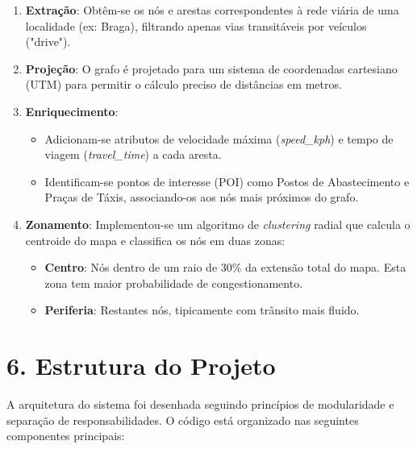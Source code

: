 \documentclass[a4paper]{article}
\begin{document}
\begin{enumerate}
    \item \textbf{Extração}: Obtêm-se os nós e arestas correspondentes à rede viária de uma localidade (ex: Braga), filtrando apenas vias transitáveis por veículos ("drive").
    \item \textbf{Projeção}: O grafo é projetado para um sistema de coordenadas cartesiano (UTM) para permitir o cálculo preciso de distâncias em metros.
    \item \textbf{Enriquecimento}:
    \begin{itemize}
        \item Adicionam-se atributos de velocidade máxima (\textit{speed\_kph}) e tempo de viagem (\textit{travel\_time}) a cada aresta.
        \item Identificam-se pontos de interesse (POI) como Postos de Abastecimento e Praças de Táxis, associando-os aos nós mais próximos do grafo.
    \end{itemize}
    \item \textbf{Zonamento}: Implementou-se um algoritmo de \textit{clustering} radial que calcula o centroide do mapa e classifica os nós em duas zonas:
    \begin{itemize}
        \item \textbf{Centro}: Nós dentro de um raio de 30\% da extensão total do mapa. Esta zona tem maior probabilidade de congestionamento.
        \item \textbf{Periferia}: Restantes nós, tipicamente com trânsito mais fluido.
    \end{itemize}
\end{enumerate}

\section*{6. Estrutura do Projeto}
\noindent A arquitetura do sistema foi desenhada seguindo princípios de modularidade e separação de responsabilidades. O código está organizado nas seguintes componentes principais:
\end{document}
